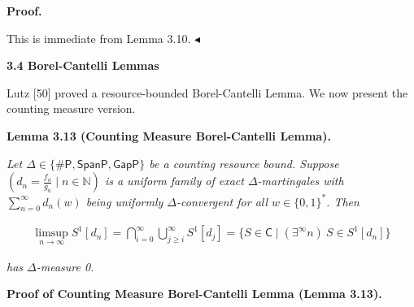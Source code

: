 



\par\medskip\noindent\textbf{Proof.}\par




This is immediate from Lemma 3.10.
$\blacktriangleleft$\par






\par\medskip\noindent\textbf{
3.4 Borel-Cantelli Lemmas}\par




Lutz [50] proved a resource-bounded Borel-Cantelli Lemma. We now
present the counting measure version.\par





\par\medskip\noindent\textbf{
\textbf{Lemma 3.13}\textbf{ }(Counting Measure Borel-Cantelli Lemma)\textbf{.}
}\par



\emph{Let $\Delta\in\{{\mathsf{\#}\mathsf{P}},\mathsf{SpanP},\mathsf{GapP}\}$ be a counting resource bound.
Suppose $(d_{n}=\frac{f_{n}}{g_{n}}\mid n\in\mathbb{N})$ is a uniform family of exact
$\Delta$-martingales with $\sum_{n=0}^{\infty}d_{n}(w)$ being uniformly
$\Delta$-convergent for all $w\in\{0,1\}^{*}$.
Then}\par


\[\begin{gathered}
\limsup\limits_{n\to\infty}S^{1}[d_{n}]=\bigcap_{i=0}^{\infty}\bigcup_{j\geq i}^{\infty}S^{1}[d_{j}]=\{S\in\mathsf{C}\mid(\exists^{\infty}n)\ S\in S^{1}[d_{n}]\}
\end{gathered}\]


\emph{has $\Delta$-measure 0.}\par






\par\medskip\noindent\textbf{Proof of Counting Measure Borel-Cantelli Lemma (Lemma 3.13).}\par




